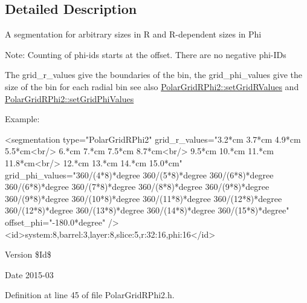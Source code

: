 \subsection{Detailed Description}
A segmentation for arbitrary sizes in R and R-\/dependent sizes in Phi\par
 Note: Counting of phi-\/ids starts at the offset. There are no negative phi-\/IDs\par
 The grid\_\-r\_\-values give the boundaries of the bin, the grid\_\-phi\_\-values give the size of the bin for each radial bin see also \hyperlink{class_d_d4hep_1_1_d_d_segmentation_1_1_polar_grid_r_phi2_a2194e846c26953f06cc74481d8aadeb4}{PolarGridRPhi2::setGridRValues} and \hyperlink{class_d_d4hep_1_1_d_d_segmentation_1_1_polar_grid_r_phi2_a738e77165e575ee463fab4e5daec543b}{PolarGridRPhi2::setGridPhiValues}\par
 Example:\par
 \begin{DoxyVerb}
    <segmentation type="PolarGridRPhi2"
                  grid_r_values="3.2*cm 3.7*cm 4.9*cm 5.5*cm<br/>
                                 6.*cm 7.*cm 7.5*cm 8.7*cm<br/>
                                 9.5*cm 10.*cm 11.*cm 11.8*cm<br/>
                                 12.*cm 13.*cm 14.*cm 15.0*cm"
                  grid_phi_values="360/(4*8)*degree 360/(5*8)*degree
                                   360/(6*8)*degree 360/(6*8)*degree
                                   360/(7*8)*degree 360/(8*8)*degree
                                   360/(9*8)*degree 360/(9*8)*degree
                                   360/(10*8)*degree 360/(11*8)*degree
                                   360/(12*8)*degree 360/(12*8)*degree
                                   360/(13*8)*degree 360/(14*8)*degree
                                   360/(15*8)*degree"
                  offset_phi="-180.0*degree"
                     />
    <id>system:8,barrel:3,layer:8,slice:5,r:32:16,phi:16</id>
   \end{DoxyVerb}
 \begin{DoxyVersion}{Version}
\$Id\$ 
\end{DoxyVersion}
\begin{DoxyDate}{Date}
2015-\/03 
\end{DoxyDate}


Definition at line 45 of file PolarGridRPhi2.h.

